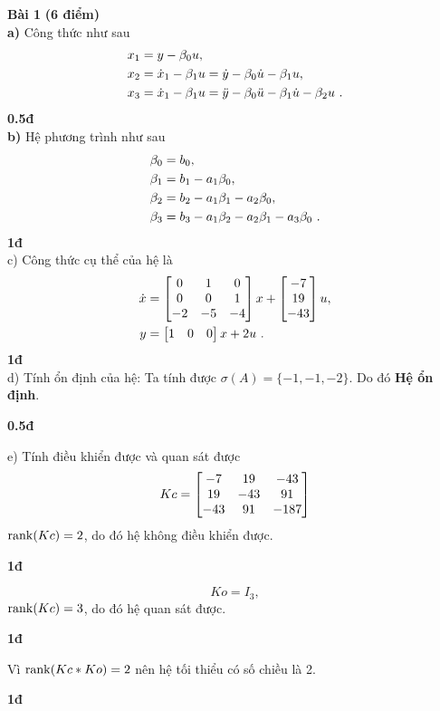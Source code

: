 \documentclass[11pt]{article}
\begin{document}
\noindent \textbf{Bài 1} \textbf{(6 điểm)}  \\
\textbf{a)} Công thức như sau
\begin{align*}
	x_1 &= y - \beta_0 u, \\
	x_2 &= \dot{x}_1 - \beta_1 u = \dot{y} - \beta_0 \dot{u} - \beta_1 u, \\
	x_3 &= \dot{x}_1 - \beta_1 u = \ddot{y} - \beta_0 \ddot{u} - \beta_1 \dot{u} - \beta_2 u \ .
\end{align*}
%
\hfill \textbf{0.5đ} \\
\textbf{b)} Hệ phương trình như sau
%
\begin{align*}
	\beta_0 &= b_0, \\
	\beta_1 &= b_1 - a_1 \beta_0, \\
	\beta_2 &= b_2 - a_1 \beta_1  - a_2 \beta_0, \\
	\beta_3 &= b_3 - a_1 \beta_2 - a_2 \beta_1  - a_3 \beta_0 \ .
\end{align*}
%
\hfill \textbf{1đ} \\
c) Công thức cụ thể của hệ là
%
\begin{align}
	\dot{x} &= \begin{bmatrix} 0 & 1 & 0 \\ 0 & 0 & 1 \\ -2 & -5 & -4 \end{bmatrix} x + \begin{bmatrix} -7 \\ 19 \\ -43 \end{bmatrix} u, \\
	y &= \begin{bmatrix} 1 & 0 & 0 \end{bmatrix} x + 2 u \ .
\end{align}
% 
\hfill \textbf{1đ} \\
d) Tính ổn định của hệ: Ta tính được $\sigma(A) = \{-1,-1,-2\}$.  Do đó \textbf{Hệ ổn định}. 
%
\begin{flushright}
	\textbf{0.5đ}
\end{flushright}
%
e) Tính điều khiển được và quan sát được
%
\[
Kc = \begin{bmatrix} -7  &  19  & -43 \\ 19  & -43 &   91 \\ -43  &  91 &  -187  \end{bmatrix}
\]
%
$\mathrm{rank}(Kc) = 2$, do đó hệ không điều khiển được. 
%
\begin{flushright}
	\textbf{1đ}
\end{flushright}

%
\[
Ko = I_3,
\]
%
$\mathrm{rank}(Kc) = 3$, do đó hệ quan sát được. 
%
\begin{flushright}
	\textbf{1đ}
\end{flushright}
%
Vì $\mathrm{rank}(Kc * Ko) = 2$ nên hệ tối thiểu có số chiều là 2.
\begin{flushright}
	\textbf{1đ}
\end{flushright}
\end{document}
